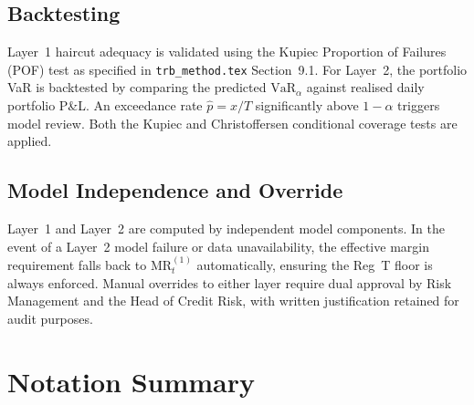 \documentclass[12pt, a4paper]{article}
\newcommand{\MR}{\mathrm{MR}}
\newcommand{\VaR}{\mathrm{VaR}}
\begin{document}
\subsection{Backtesting}

Layer~1 haircut adequacy is validated using the Kupiec Proportion of
Failures (POF) test as specified in \texttt{trb\_method.tex} Section~9.1.
For Layer~2, the portfolio VaR is backtested by comparing the predicted
$\VaR_\alpha$ against realised daily portfolio P\&L. An exceedance rate
$\hat{p} = x/T$ significantly above $1-\alpha$ triggers model review.
Both the Kupiec and Christoffersen conditional coverage tests are applied.

\subsection{Model Independence and Override}

Layer~1 and Layer~2 are computed by independent model components. In the
event of a Layer~2 model failure or data unavailability, the effective
margin requirement falls back to $\MR_t^{(1)}$ automatically, ensuring
the Reg~T floor is always enforced. Manual overrides to either layer
require dual approval by Risk Management and the Head of Credit Risk,
with written justification retained for audit purposes.

\appendix

\section{Notation Summary}
\label{app:notation}
\end{document}
